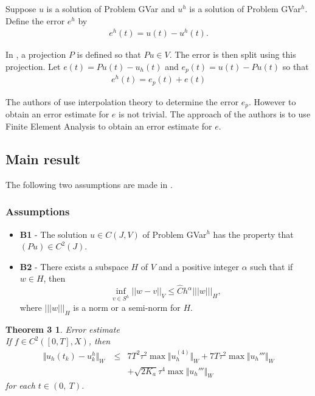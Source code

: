 \documentclass[../../main.tex]{subfiles}
\begin{document}
Suppose $u$ is a solution of Problem GVar and $u^h$ is a solution of Problem GVar$^h$. Define the error $e^h$ by 
\begin{eqnarray*}
	e^h(t) = u(t) - u^h(t).
\end{eqnarray*}

In \cite{BV13}, a projection $P$ is defined so that $Pu \in V$. The error is then split using this projection. Let $e(t) = Pu(t)- u_h(t)$ and $e_p(t) = u(t) - Pu(t)$ so that 
\begin{eqnarray}
	e^h(t) = e_p(t) +e(t) \label{Error}
\end{eqnarray}

The authors of \cite{BV13} use interpolation theory to determine the error $e_p$. However to obtain an error estimate for $e$ is not trivial. The approach of the authors is to use Finite Element Analysis to obtain an error estimate for $e$.

\subsection{Main result}

The following two assumptions are made in \cite{BV13}.
\subsubsection*{Assumptions}
\begin{itemize}
	\item[] \textbf{B1} - The solution $u \in C(J,V)$ of Problem GVar$^h$ has the property that $(Pu) \in C^2(J)$.
	
	\item[] \textbf{B2} - There exists a subspace $H$ of $V$ and a positive integer $\alpha$ such that if $w \in H$, then $$\inf_{v\in S^{h}}||w-v||_V \leq \hat{C} h^\alpha|||w|||_H,$$ where $|||w|||_H$ is a norm or a semi-norm for $H$.
\end{itemize}

\newtheorem*{DC_Thm5}{Theorem 3}
\begin{DC_Thm5}
	Error estimate\\
	If $f\in C^{2}([0,T],X)$, then
	\begin{eqnarray*}
		\Vert u_{h}(t_{k})-u_{k}^{h}\Vert_{W}\ & \leq & 7T^{2}\tau^{2}\max\Vert u_{h}^{(4)}\Vert_{W}+7T\tau^{2}\max\Vert u_{h}'''\Vert_{W}\\
		& & + \sqrt{2K_{a}}\tau^{4}\max\Vert u_{h}'''\Vert_{W}
	\end{eqnarray*}
	for each $t\in(0,\ T)$.
\end{DC_Thm5}
\end{document}
